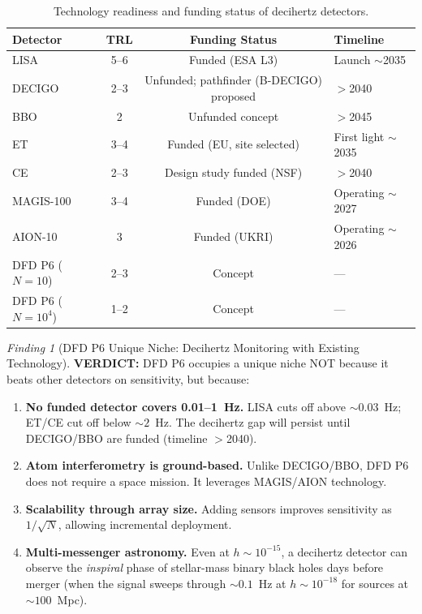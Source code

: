 \documentclass[11pt]{article}
\theoremstyle{definition}
\theoremstyle{remark}
\newtheorem{finding}[theorem]{Finding}
\newcommand{\verdict}[1]{\textcolor{green!50!black}{\textbf{VERDICT:} #1}}
\begin{document}
\begin{table}[H]
\centering
\caption{Technology readiness and funding status of decihertz detectors.}
\label{tab:P6-TRL}
\begin{tabular}{@{}lccl@{}}
\toprule
Detector & TRL & Funding Status & Timeline \\
\midrule
LISA & 5--6 & Funded (ESA L3) & Launch $\sim$2035 \\
DECIGO & 2--3 & Unfunded; pathfinder (B-DECIGO) proposed & $>$2040 \\
BBO & 2 & Unfunded concept & $>$2045 \\
ET & 3--4 & Funded (EU, site selected) & First light $\sim$2035 \\
CE & 2--3 & Design study funded (NSF) & $>$2040 \\
\midrule
MAGIS-100 & 3--4 & Funded (DOE) & Operating $\sim$2027 \\
AION-10 & 3 & Funded (UKRI) & Operating $\sim$2026 \\
DFD P6 ($N=10$) & 2--3 & Concept & --- \\
DFD P6 ($N=10^4$) & 1--2 & Concept & --- \\
\bottomrule
\end{tabular}
\end{table}

\begin{finding}[DFD P6 Unique Niche: Decihertz Monitoring with Existing Technology]
\label{find:P6-niche}
\verdict{DFD P6 occupies a unique niche NOT because it beats other detectors
on sensitivity, but because:}
\begin{enumerate}[nosep]
\item \textbf{No funded detector covers 0.01--1~Hz.} LISA cuts off above
  $\sim 0.03$~Hz; ET/CE cut off below $\sim 2$~Hz. The decihertz gap will
  persist until DECIGO/BBO are funded (timeline $>$2040).
\item \textbf{Atom interferometry is ground-based.} Unlike DECIGO/BBO, DFD P6
  does not require a space mission. It leverages MAGIS/AION technology.
\item \textbf{Scalability through array size.} Adding sensors improves
  sensitivity as $1/\sqrt{N}$, allowing incremental deployment.
\item \textbf{Multi-messenger astronomy.} Even at $h \sim 10^{-15}$, a
  decihertz detector can observe the \emph{inspiral} phase of stellar-mass
  binary black holes days before merger (when the signal sweeps through
  $\sim 0.1$~Hz at $h \sim 10^{-18}$ for sources at $\sim 100$~Mpc).
\end{enumerate}
\end{finding}
\end{document}
